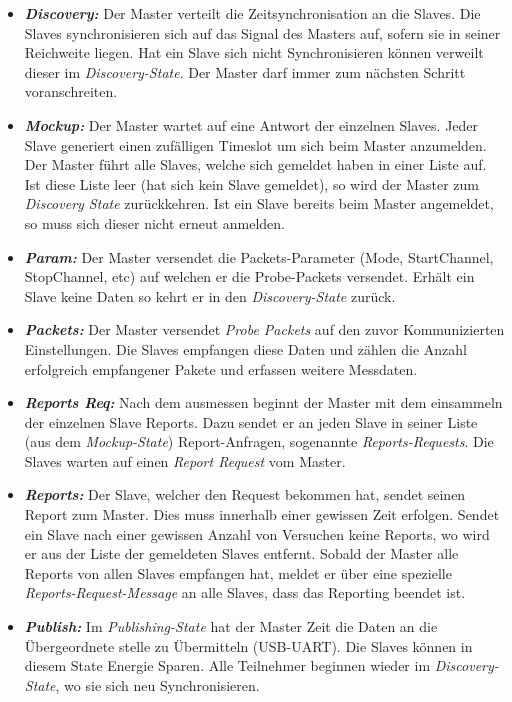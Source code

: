 \begin{itemize}
	\item \textbf{\textit{Discovery:}} Der Master verteilt die Zeitsynchronisation an die Slaves. Die Slaves synchronisieren sich auf das Signal des Masters auf, sofern sie in seiner Reichweite liegen. Hat ein Slave sich nicht Synchronisieren können verweilt dieser im \textit{Discovery-State}. Der Master darf immer zum nächsten Schritt voranschreiten. 
	\item \textbf{\textit{Mockup:}} Der Master wartet auf eine Antwort der einzelnen Slaves. Jeder Slave generiert einen zufälligen Timeslot um sich beim Master anzumelden. Der Master führt alle Slaves, welche sich gemeldet haben in einer Liste auf. Ist diese Liste leer (hat sich kein Slave gemeldet), so wird der Master zum \textit{Discovery State} zurückkehren. Ist ein Slave bereits beim Master angemeldet, so muss sich dieser nicht erneut anmelden. 
	\item \textbf{\textit{Param:}} Der Master versendet die Packets-Parameter (Mode, StartChannel, StopChannel, etc) auf welchen er die Probe-Packets versendet. Erhält ein Slave keine Daten so kehrt er in den \textit{Discovery-State} zurück. 
	\item \textbf{\textit{Packets:}} Der Master versendet \textit{Probe Packets} auf den zuvor Kommunizierten Einstellungen. Die Slaves empfangen diese Daten und zählen die Anzahl erfolgreich empfangener Pakete und erfassen weitere Messdaten. 
	\item  \textbf{\textit{Reports Req:}} Nach dem ausmessen beginnt der Master mit dem einsammeln der einzelnen Slave Reports. Dazu sendet er an jeden Slave in seiner Liste (aus dem \textit{Mockup-State}) Report-Anfragen, sogenannte \textit{Reports-Requests}. Die Slaves warten auf einen \textit{Report Request} vom Master. 
	\item  \textbf{\textit{Reports:}} Der Slave, welcher den Request bekommen hat, sendet seinen Report zum Master. Dies muss innerhalb einer gewissen Zeit erfolgen. Sendet ein Slave nach einer gewissen Anzahl von Versuchen keine Reports, wo wird er aus der Liste der gemeldeten Slaves entfernt. Sobald der Master alle Reports von allen Slaves empfangen hat, meldet er über eine spezielle \textit{Reports-Request-Message} an alle Slaves, dass das Reporting beendet ist.
	\item  \textbf{\textit{Publish:}} Im \textit{Publishing-State} hat der Master Zeit die Daten an die Übergeordnete stelle zu Übermitteln (USB-UART). Die Slaves können in diesem State Energie Sparen. Alle Teilnehmer beginnen wieder im \textit{Discovery-State}, wo sie sich neu Synchronisieren. 
\end{itemize}


